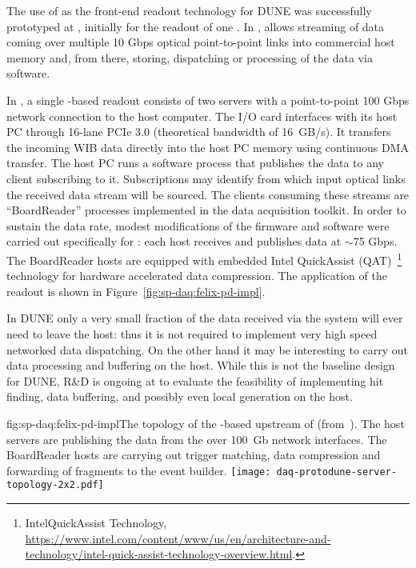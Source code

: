 The use of  as the front-end readout technology for DUNE was
successfully prototyped at , initially for the readout of one
. In ,  allows streaming of data coming over multiple 10
Gbps optical point-to-point links into commercial host memory and,
from there, storing, dispatching or processing of the data via
software. 

In , a single  -based readout consists of two servers with a point-to-point 100 Gbps network connection to the  host computer.
The  I/O card interfaces with its host PC through 16-lane PCIe 3.0 (theoretical bandwidth of \SI{16}{GB/s}).
It transfers the incoming WIB data directly into the host PC memory using continuous DMA transfer. The  host PC runs a software process that publishes the data to any client subscribing to it.
Subscriptions may identify from which input optical links the received data stream will be sourced.
The clients consuming these streams are ``BoardReader'' processes implemented in the  data acquisition toolkit.
In order to sustain the data rate, modest modifications of the firmware and software were carried out specifically for : each  host receives and publishes data at $\sim$75 Gbps. The BoardReader hosts are equipped with embedded Intel QuickAssist (QAT)~\footnote{Intel\textregistered QuickAssist Technology, \url{https://www.intel.com/content/www/us/en/architecture-and-technology/intel-quick-assist-technology-overview.html}.} technology for hardware accelerated data compression. The  application of the   readout is shown in Figure~\ref{fig:sp-daq:felix-pd-impl}.


In DUNE only a very small fraction of the data received via the 
system will ever need to leave the host: thus it is not required to
implement very high speed networked data dispatching. On the other
hand it may be interesting to carry out data processing and buffering
on the host. While this is not the baseline design for DUNE, R\&D is
ongoing at  to evaluate the feasibility of
implementing hit finding, data buffering, and possibly even local
 generation on the  host. 


\begin{dunefigure}{fig:sp-daq:felix-pd-impl}{The topology of the -based
    upstream  of  (from~\cite{pdsp-felix}). The  host servers are publishing the data from the  over \SI{100}{Gb} network interfaces. The BoardReader hosts are carrying out trigger matching, data compression and forwarding of fragments to the event builder.}
  \texttt{[image: daq-protodune-server-topology-2x2.pdf]}
\end{dunefigure}

